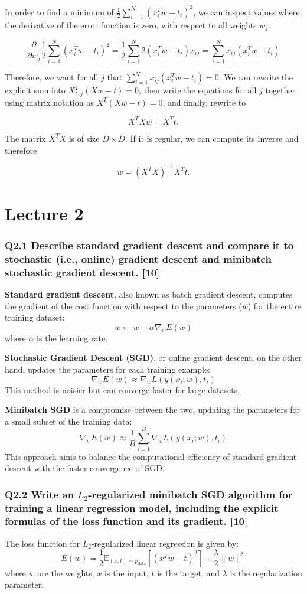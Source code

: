 \documentclass[11pt]{article}
\begin{document}
In order to find a minimum of \( \frac{1}{2} \sum_{i=1}^{N} (x_i^T w - t_i)^2 \), we can inspect values where the derivative of the error function is zero, with respect to all weights \( w_j \).

\[
\frac{\partial}{\partial w_j} \frac{1}{2} \sum_{i=1}^{N} (x_i^T w - t_i)^2 = \frac{1}{2} \sum_{i=1}^{N} 2(x_i^T w - t_i)x_{ij} = \sum_{i=1}^{N} x_{ij}(x_i^T w - t_i)
\]

Therefore, we want for all \( j \) that \( \sum_{i=1}^{N} x_{ij}(x_i^T w - t_i) = 0 \). We can rewrite the explicit sum into \( X_{*,j}^T (Xw - t) = 0 \), then write the equations for all \( j \) together using matrix notation as \( X^T(Xw - t) = 0 \), and finally, rewrite to

\[
X^TXw = X^Tt.
\]

The matrix \( X^TX \) is of size \( D \times D \). If it is regular, we can compute its inverse and therefore

\[
w = (X^TX)^{-1}X^Tt.
\]

\part{Lecture 2}
\section{Q2.1 Describe standard gradient descent and compare it to stochastic (i.e., online) gradient descent and minibatch stochastic gradient descent. [10]}

\textbf{Standard gradient descent}, also known as batch gradient descent, computes the gradient of the cost function with respect to the parameters (\( w \)) for the entire training dataset:
\[
w \leftarrow w - \alpha \nabla_w E(w)
\]
where \( \alpha \) is the learning rate.

\textbf{Stochastic Gradient Descent (SGD)}, or online gradient descent, on the other hand, updates the parameters for each training example:
\[
\nabla_w E(w) \approx \nabla_w L(y(x_i; w), t_i)
\]
This method is noisier but can converge faster for large datasets.

\textbf{Minibatch SGD} is a compromise between the two, updating the parameters for a small subset of the training data:
\[
\nabla_w E(w) \approx \frac{1}{B} \sum_{i=1}^{B} \nabla_w L(y(x_i; w), t_i)
\]
This approach aims to balance the computational efficiency of standard gradient descent with the faster convergence of SGD.

\section{Q2.2 Write an \( L_2 \)-regularized minibatch SGD algorithm for training a linear regression model, including the explicit formulas of the loss function and its gradient. [10]}
The loss function for \( L_2 \)-regularized linear regression is given by:
\[
E(w) = \frac{1}{2} \mathbb{E}_{(x,t)\sim p_{\text{data}}} [(x^T w - t)^2] + \frac{\lambda}{2} \|w\|^2
\]
where \( w \) are the weights, \( x \) is the input, \( t \) is the target, and \( \lambda \) is the regularization parameter.
\end{document}
